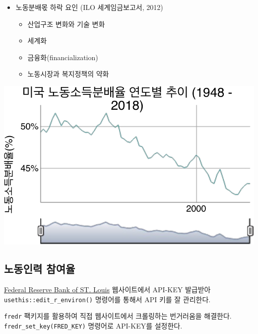 \documentclass[smallextended]{svjour3}       %
\providecommand{\tightlist}{%
  \setlength{\itemsep}{0pt}\setlength{\parskip}{0pt}}
\begin{document}
\begin{itemize}
\tightlist
\item
  노동분배몫 하락 요인 (ILO 세계임금보고서, 2012)

  \begin{itemize}
  \tightlist
  \item
    산업구조 변화와 기술 변화
  \item
    세계화
  \item
    금융화(financialization)
  \item
    노동시장과 복지정책의 약화
  \end{itemize}
\end{itemize}

\begin{center}\includegraphics{paper_files/figure-latex/labor-share-us-1} \end{center}

\hypertarget{labor-participation}{%
\subsection{노동인력 참여율}\label{labor-participation}}

\href{https://research.stlouisfed.org/docs/api/api_key.html}{Federal
Reserve Bank of ST. Louis} 웹사이트에서 API-KEY 발급받아
\texttt{usethis::edit\_r\_environ()} 명령어를 통해서 API 키를 잘
관리한다.

\texttt{fredr} 팩키지를 활용하여 직접 웹사이트에서 크롤링하는 번거러움을
해결한다. \texttt{fredr\_set\_key(FRED\_KEY)} 명령어로 API-KEY를
설정한다.
\end{document}
